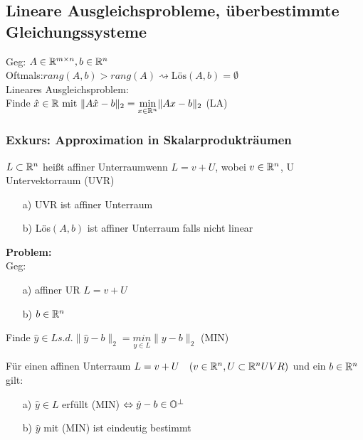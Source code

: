 \subsection{Lineare Ausgleichsprobleme, überbestimmte Gleichungssysteme}
Geg: $A \in \mathbb R^{m\times n}, b\in \mathbb R^n$\\
Oftmals:$rang(A,b)>rang(A) \rightsquigarrow \text{Lös}(A,b) = \emptyset$\\

Lineares Ausgleichsproblem:\\
Finde $\hat{x} \in \mathbb R \text{ mit } \|A\hat{x}-b\|_2 = \underset{x \in \mathbb R^n}{\mathrm{min}}\|Ax-b\|_2$ (LA)
\subsubsection{Exkurs: Approximation in Skalarprodukträumen}
\begin{Definition}
$L \subset \mathbb R^n$ heißt \glqq affiner Unterraum\grqq wenn $L=v+U$, wobei $v \in \mathbb R^n$, U Untervektorraum (UVR)
\end{Definition}
\begin{Beispiel}\hfill
	\begin{itemize}
	\item[a)] UVR ist affiner Unterraum
	\item[b)] Lös$(A,b)$ ist affiner Unterraum falls nicht linear
	\end{itemize}
\end{Beispiel}
\textbf{Problem:}\\
Geg: \begin{itemize}
	 \item[a)] affiner UR $L=v+U$
	 \item[b)] $b \in \mathbb R^n$
	 \end{itemize}
Finde $\hat{y} \in L s.d. \|\hat{y}-b\|_2 = \underset{y \in L}{min} \|y-b\|_2$ (MIN)\\
\begin{Satz}
Für einen affinen Unterraum $L=v+U\quad(v\in \mathbb R^n, U\subset \mathbb R^n UVR)$ und ein $b\in \mathbb R^n$ gilt:\\
\begin{itemize}
\item[a)]$\hat{y} \in L$ erfüllt (MIN) $\Leftrightarrow \hat{y}-b\in\mathbb O^{\perp}$
\item[b)]$\hat{y}$ mit (MIN) ist eindeutig bestimmt
\end{itemize}
\end{Satz}
